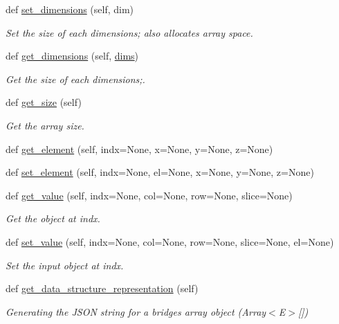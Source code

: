 \begin{DoxyCompactItemize}
def \mbox{\hyperlink{class_bridges_1_1array_1_1_array_aeb34acd2d485e00a520b30def036c04a}{set\+\_\+dimensions}} (self, dim)
\begin{DoxyCompactList}\small\item\em Set the size of each dimensions; also allocates array space. \end{DoxyCompactList}\item 
def \mbox{\hyperlink{class_bridges_1_1array_1_1_array_ae1c8790e3892cf5fc1498f5f90178d3c}{get\+\_\+dimensions}} (self, \mbox{\hyperlink{class_bridges_1_1array_1_1_array_ac037f96fff9569134da9d66e33bc1f0f}{dims}})
\begin{DoxyCompactList}\small\item\em Get the size of each dimensions;. \end{DoxyCompactList}\item 
def \mbox{\hyperlink{class_bridges_1_1array_1_1_array_ac61f92d0248dd8b39383a050878219fb}{get\+\_\+size}} (self)
\begin{DoxyCompactList}\small\item\em Get the array size. \end{DoxyCompactList}\item 
def \mbox{\hyperlink{class_bridges_1_1array_1_1_array_a8d726d606d257c1743bc452600f60ebc}{get\+\_\+element}} (self, indx=None, x=None, y=None, z=None)
\item 
def \mbox{\hyperlink{class_bridges_1_1array_1_1_array_a0b958240df973d0baff2bca43fe99b45}{set\+\_\+element}} (self, indx=None, el=None, x=None, y=None, z=None)
\item 
def \mbox{\hyperlink{class_bridges_1_1array_1_1_array_af736e28d3c0171b9ce7f730897e3d8c0}{get\+\_\+value}} (self, indx=None, col=None, row=None, slice=None)
\begin{DoxyCompactList}\small\item\em Get the object at \textquotesingle{}indx\textquotesingle{}. \end{DoxyCompactList}\item 
def \mbox{\hyperlink{class_bridges_1_1array_1_1_array_ae89fab48c57356c500f9bc96ed57ec0a}{set\+\_\+value}} (self, indx=None, col=None, row=None, slice=None, el=None)
\begin{DoxyCompactList}\small\item\em Set the input object at \textquotesingle{}indx\textquotesingle{}. \end{DoxyCompactList}\item 
def \mbox{\hyperlink{class_bridges_1_1array_1_1_array_a052a58caa8082e8d6ff49b9f6f2c1884}{get\+\_\+data\+\_\+structure\+\_\+representation}} (self)
\begin{DoxyCompactList}\small\item\em Generating the J\+S\+ON string for a bridges array object (Array$<$\+E$>$\mbox{[}\mbox{]}) \end{DoxyCompactList}\end{DoxyCompactItemize}
